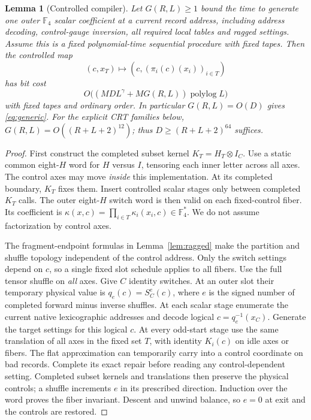 \documentclass[11pt]{article}
\newtheorem{lemma}[theorem]{Lemma}
\newcommand{\F}{\mathbb F}
\newcommand{\polylog}{\operatorname{polylog}}
\begin{document}
\begin{lemma}[Controlled compiler]
\label{lem:controlled}
Let $G(R,L)\ge1$ bound the time to generate one outer $\F_4$ scalar
coefficient at a current record address, including address decoding,
control-gauge inversion, all required local tables and ragged settings.
Assume this is a fixed polynomial-time sequential procedure with fixed
tapes. Then the controlled map
\[
 (c,x_T)\longmapsto(c,(\pi_i(c)(x_i))_{i\in T})
\]
has bit cost
\[
 O\bigl((MDL^\gamma+MG(R,L))\polylog L\bigr)
\]
with fixed tapes and ordinary order. In particular $G(R,L)=O(D)$
gives \eqref{eq:generic}. For the explicit CRT families below,
$G(R,L)=O((R+L+2)^{12})$; thus $D\ge(R+L+2)^{64}$ suffices.
\end{lemma}
\begin{proof}
First construct the completed subset kernel
$K_T=H_T\otimes I_C$. Use a static common eight-$H$ word for $H$ versus
$I$, tensoring each inner letter across all axes. The control axes may
move \emph{inside} this implementation. At its completed boundary,
$K_T$ fixes them. Insert controlled scalar stages only between completed
$K_T$ calls. The outer eight-$H$ switch word is then valid on each
fixed-control fiber. Its coefficient is
$\kappa(x,c)=\prod_{i\in T}\kappa_i(x_i,c)\in\F_4^*$.
We do not assume factorization by control axes.

The fragment-endpoint formulas in Lemma~\ref{lem:ragged} make the
partition and shuffle topology independent of the control address.
Only the switch settings depend on $c$, so a single fixed slot
schedule applies to all fibers.
Use the full tensor shuffle on \emph{all} axes. Give $C$ identity
switches. At an outer slot their temporary physical value is
$q_e(c)=S_C^e(c)$, where $e$ is the signed number of completed forward
minus inverse shuffles. At each scalar stage enumerate the current
native lexicographic addresses and decode logical
$c=q_e^{-1}(x_C)$. Generate the target settings for this logical $c$.
At every odd-start stage use the same translation of all axes in the
fixed set $T$, with identity $K_i(c)$ on idle axes or fibers. The flat
approximation can temporarily carry into a control coordinate on bad
records. Complete its exact repair before reading any control-dependent
setting. Completed subset kernels and translations then preserve the
physical controls; a shuffle increments $e$ in its prescribed direction.
Induction over the word proves the fiber invariant. Descent and unwind
balance, so $e=0$ at exit and the controls are restored.


\end{proof}
\end{document}
